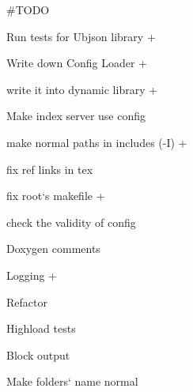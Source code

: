\#\-T\-O\-D\-O


\begin{DoxyItemize}
\item Run tests for Ubjson library +
\item Write down Config Loader +
\item write it into dynamic library +
\item Make index server use config
\item make normal paths in includes (-\/\-I) +
\item fix ref links in tex
\item fix root`s makefile +
\item check the validity of config
\item Doxygen comments
\item Logging +
\item Refactor
\item Highload tests
\item Block output
\item Make folders` name normal 
\end{DoxyItemize}